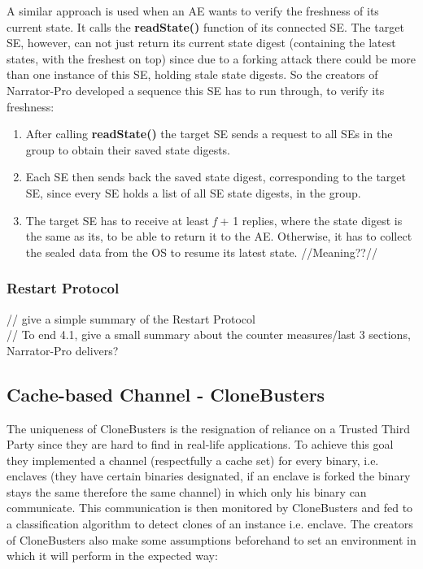 A similar approach is used when an AE wants to verify the freshness of its current state. It calls the \textbf{readState()} function of its connected SE. The target SE, however, can not just return its current state digest (containing the latest states, with the freshest on top)
since due to a forking attack there could be more than one instance of this SE, holding stale state digests. So the creators of Narrator-Pro developed a sequence this SE has to run through, to verify its freshness:
\begin{enumerate}
    \item After calling \textbf{readState()} the target SE sends a request to all SEs in the group to obtain their saved state digests.
    \item Each SE then sends back the saved state digest, corresponding to the target SE, since every SE holds a list of all SE state digests, in the group.
    \item The target SE has to receive at least \textit{f} + 1 replies, where the state digest is the same as its, to be able to return it to the AE. Otherwise, it has to collect the sealed data from the OS to resume its latest state. //Meaning??//
\end{enumerate}


\subsubsection{Restart Protocol}

// give a simple summary of the Restart Protocol
\\



// To end 4.1, give a small summary about the counter measures/last 3 sections, Narrator-Pro delivers?


\subsection{Cache-based Channel - CloneBusters}

The uniqueness of CloneBusters is the resignation of reliance on a Trusted Third Party since they are hard to find in real-life applications. To achieve this goal they implemented a channel (respectfully a cache set) for every binary, i.e. enclaves (they have certain binaries designated, if an enclave is forked the binary stays the same therefore the same channel) in which only his binary can communicate. This communication is then monitored by CloneBusters and fed to a classification algorithm to detect clones of an instance i.e. enclave. The creators of CloneBusters also make some assumptions beforehand to set an environment in which it will perform in the expected way: 

